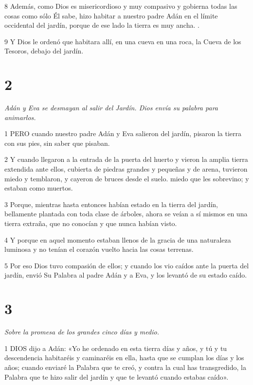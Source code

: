 \par 8 Además, como Dios es misericordioso y muy compasivo y gobierna todas las cosas como sólo Él sabe, hizo habitar a nuestro padre Adán en el límite occidental del jardín, porque de ese lado la tierra es muy ancha. .

\par 9 Y Dios le ordenó que habitara allí, en una cueva en una roca, la Cueva de los Tesoros, debajo del jardín.

\chapter{2}

\par \textit{Adán y Eva se desmayan al salir del Jardín. Dios envía su palabra para animarlos.}

\par 1 PERO cuando nuestro padre Adán y Eva salieron del jardín, pisaron la tierra con sus pies, sin saber que pisaban.

\par 2 Y cuando llegaron a la entrada de la puerta del huerto y vieron la amplia tierra extendida ante ellos, cubierta de piedras grandes y pequeñas y de arena, tuvieron miedo y temblaron, y cayeron de bruces desde el suelo. miedo que les sobrevino; y estaban como muertos.

\par 3 Porque, mientras hasta entonces habían estado en la tierra del jardín, bellamente plantada con toda clase de árboles, ahora se veían a sí mismos en una tierra extraña, que no conocían y que nunca habían visto.

\par 4 Y porque en aquel momento estaban llenos de la gracia de una naturaleza luminosa y no tenían el corazón vuelto hacia las cosas terrenas.

\par 5 Por eso Dios tuvo compasión de ellos; y cuando los vio caídos ante la puerta del jardín, envió Su Palabra al padre Adán y a Eva, y los levantó de su estado caído.

\chapter{3}

\par \textit{Sobre la promesa de los grandes cinco días y medio.}

\par 1 DIOS dijo a Adán: «Yo he ordenado en esta tierra días y años, y tú y tu descendencia habitaréis y caminaréis en ella, hasta que se cumplan los días y los años; cuando enviaré la Palabra que te creó, y contra la cual has transgredido, la Palabra que te hizo salir del jardín y que te levantó cuando estabas caído».

